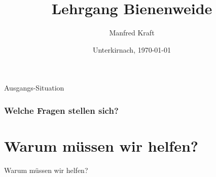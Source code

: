 \documentclass[aspectratio=43]{beamer}
\begin{document}

\author[Manfred]{Manfred Kraft}
 
\title[Bienenweide]{\textbf{Lehrgang Bienenweide}}
\date{Unterkirnach, \today}

\frame{\titlepage}



\begin{frame}{Ausgangs-Situation}
\frametitle{{Welche Fragen stellen sich?}}
\framesubtitle{} 


\tableofcontents[hideallsubsections]
\end{frame}                 


\section{Warum müssen wir helfen?}

\begin{frame}{Warum müssen wir helfen?}
\end{frame}

\end{document}
